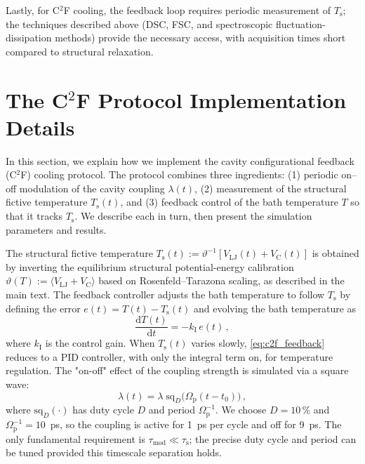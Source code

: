 Lastly, for C$^2$F cooling, the feedback loop requires periodic measurement of $T_\mathrm{s}$; the techniques described above (DSC, FSC, and spectroscopic fluctuation-dissipation methods) provide the necessary access, with acquisition times short compared to structural relaxation.

\section{The \texorpdfstring{C$^2$F}{C2F} Protocol Implementation Details}
\label{app:c2f_protocol}

In this section, we explain how we implement the cavity configurational feedback (C$^2$F) cooling protocol. The protocol combines three ingredients: (1) periodic on--off modulation of the cavity coupling $\lambda(t)$, (2) measurement of the structural fictive temperature $T_\mathrm{s}(t)$, and (3) feedback control of the bath temperature $T$ so that it tracks $T_\mathrm{s}$. We describe each in turn, then present the simulation parameters and results.

The structural fictive temperature $T_\mathrm{s}(t) := \vartheta^{-1}[V_\mathrm{LJ}(t)+V_\mathrm{C}(t)]$ is obtained by inverting the equilibrium structural potential-energy calibration $\vartheta(T) := \langle V_\mathrm{LJ}+V_\mathrm{C}\rangle$ based on Rosenfeld--Tarazona scaling,\cite{rosenfeld1998density} as described in the main text. The feedback controller adjusts the bath temperature to follow $T_\mathrm{s}$ by defining the error $e(t) = T(t)-T_\mathrm{s}(t)$ and evolving the bath temperature as
\begin{equation}
\frac{\mathrm{d}T(t)}{\mathrm{d} t} = -k_\mathrm{I}\,e(t) \,,
\label{eq:c2f_feedback}
\end{equation}
where $k_\mathrm{I}$ is the control gain. When $T_\mathrm{s}(t)$ varies slowly, \cref{eq:c2f_feedback} reduces to a PID controller, with only the integral term on, for temperature regulation. The "on-off" effect of the coupling strength is simulated via a square wave:
\begin{equation}
\lambda(t) = \lambda \; \mathrm{sq}_D\!\bigl(\Omega_\mathrm{p}(t-t_\mathrm{0})\bigr) \,,
\label{eq:c2f_squarewave}
\end{equation}
where $\mathrm{sq}_D(\cdot)$ has duty cycle $D$ and period $\Omega_\mathrm{p}^{-1}$. We choose $D=10\,\%$ and $\Omega_\mathrm{p}^{-1}=10$~ps, so the coupling is active for 1~ps per cycle and off for 9~ps. 
The only fundamental requirement is $\tau_\mathrm{mod} \ll \tau_\mathrm{s}$; the precise duty cycle and period can be tuned provided this timescale separation holds.

